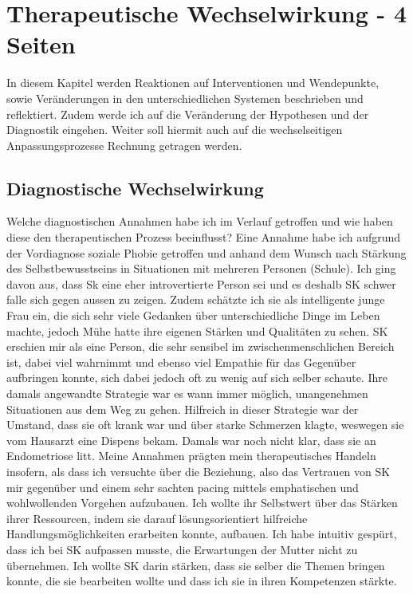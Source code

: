 \section{Therapeutische Wechselwirkung - 4 Seiten} \label{sec:TherapeutischeWechselwirkung}
In diesem Kapitel werden Reaktionen auf Interventionen und Wendepunkte, sowie Veränderungen in den unterschiedlichen Systemen beschrieben und reflektiert. Zudem werde ich auf die Veränderung der Hypothesen und der Diagnostik eingehen. Weiter soll hiermit auch auf die wechselseitigen Anpassungsprozesse Rechnung getragen werden. 

\subsection{Diagnostische Wechselwirkung} 
Welche diagnostischen Annahmen habe ich im Verlauf getroffen und wie haben diese den therapeutischen Prozess beeinflusst? Eine Annahme habe ich aufgrund der Vordiagnose soziale Phobie getroffen und anhand dem Wunsch nach Stärkung des Selbstbewusstseins in Situationen mit mehreren Personen (Schule). Ich ging davon aus, dass Sk eine eher introvertierte Person sei und es deshalb SK schwer falle sich gegen aussen zu zeigen. Zudem schätzte ich sie als intelligente junge Frau ein, die sich sehr viele Gedanken über unterschiedliche Dinge im Leben machte, jedoch Mühe hatte ihre eigenen Stärken und Qualitäten zu sehen. SK erschien mir als eine Person, die sehr sensibel im zwischenmenschlichen Bereich ist, dabei viel wahrnimmt und ebenso viel Empathie für das Gegenüber aufbringen konnte, sich dabei jedoch oft zu wenig auf sich selber schaute. Ihre damals angewandte Strategie war es wann immer möglich, unangenehmen Situationen aus dem Weg zu gehen. Hilfreich in dieser Strategie war der Umstand, dass sie oft krank war und über starke Schmerzen klagte, weswegen sie vom Hausarzt eine Dispens bekam. Damals war noch nicht klar, dass sie an Endometriose litt. Meine Annahmen prägten mein therapeutisches Handeln insofern, als dass ich versuchte über die Beziehung, also das Vertrauen von SK mir gegenüber und einem sehr sachten pacing mittels emphatischen und wohlwollenden Vorgehen aufzubauen. Ich wollte ihr Selbstwert über das Stärken ihrer Ressourcen, indem sie darauf lösungsorientiert hilfreiche Handlungsmöglichkeiten erarbeiten konnte, aufbauen. Ich habe intuitiv gespürt, dass ich bei SK aufpassen musste, die Erwartungen der Mutter nicht zu übernehmen. Ich wollte SK darin stärken, dass sie selber die Themen bringen konnte, die sie bearbeiten wollte und dass ich sie in ihren Kompetenzen stärkte. 

